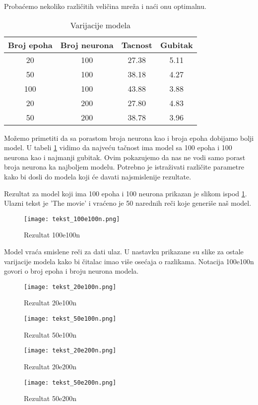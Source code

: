\documentclass[a4paper]{article}
\begin{document}
Probaćemo nekoliko različitih veličina mreža i naći onu optimalnu.

\begin{table}[]
    \centering
    \begin{tabular}{|| c c c c ||}
    \hline
    Broj epoha & Broj neurona & Tacnost & Gubitak \\
    \hline\hline
     20 & 100 & 27.38 & 5.11 \\
     50 & 100 & 38.18 & 4.27 \\
     100 & 100 & 43.88 & 3.88 \\
     20 & 200 & 27.80 & 4.83 \\
     50 & 200 & 38.78 & 3.96 \\
     \hline
    \end{tabular}
    \caption{Varijacije modela}
    \label{tab:tabela1}
\end{table}


Možemo primetiti da sa porastom broja neurona kao i broja epoha dobijamo bolji model. U tabeli \ref{tab:tabela1} vidimo da najveću tačnost ima model sa 100 epoha i 100 neurona kao i najmanji gubitak.
Ovim pokazujemo da nas ne vodi samo porast broja neurona ka najboljem modelu. Potrebno je istraživati različite parametre kako bi dosli do modela koji će davati najsmislenije rezultate.

Rezultat za model koji ima 100 epoha i 100 neurona prikazan je slikom ispod  \ref{fig:Rezultat100e100n}. Ulazni tekst je 'The movie' i vraćeno je 50 narednih reči koje generiše naš model.

\begin{figure}[htp]
    \centering
    \texttt{[image: tekst\_100e100n.png]}
    \caption{Rezultat 100e100n}
    \label{fig:Rezultat100e100n}
\end{figure}

Model vraća smislene reči za dati ulaz. U nastavku prikazane su slike za ostale varijacije modela kako bi čitalac imao više osećaja o razlikama. Notacija 100e100n govori o broj epoha i broju neurona modela.

\begin{figure}[h]
    \centering
    \texttt{[image: tekst\_20e100n.png]}
    \caption{Rezultat 20e100n}
    \label{fig:Rezultat20e100n}
\end{figure}

\begin{figure}[h]
    \centering
    \texttt{[image: tekst\_50e100n.png]}
    \caption{Rezultat 50e100n}
    \label{fig:Rezultat50e100n}
\end{figure}
\begin{figure}[h]
    \centering
    \texttt{[image: tekst\_20e200n.png]}
    \caption{Rezultat 20e200n}
    \label{fig:Rezultat20e200n}
\end{figure}
\begin{figure}[h]
    \centering
    \texttt{[image: tekst\_50e200n.png]}
    \caption{Rezultat 50e200n}
    \label{fig:Rezultat50e200n}
\end{figure}
\end{document}
